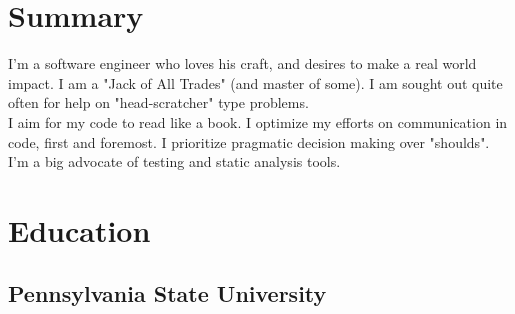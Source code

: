 \documentclass[letterpaper]{deedy-resume} %
\begin{document}

\lastupdated %



\begin{minipage}[t]{0.33\textwidth} %


\section{Summary} 

I'm a software engineer who loves his craft, and desires to make a real world impact. I am a "Jack of All Trades" (and master of some).  I am sought out quite often for help on "head-scratcher" type problems.  \\

I aim for my code to read like a book. I optimize my efforts on communication in code, first and foremost. I prioritize pragmatic decision making over "shoulds".  I'm a big advocate of testing and static analysis tools. 

\sectionspace %


\section{Education} 

\subsection{Pennsylvania State \newline University}


\end{minipage}
\end{document}
